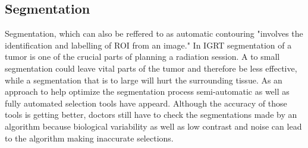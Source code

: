 \subsection{Segmentation}
\label{Segmentation}
Segmentation, which can also be reffered to as automatic contouring "involves the identification and labelling of ROI from an image."
 \cite[p.139]{lineyMRIRadiotherapyPlanning2019}
In IGRT segmentation of a tumor is one of the crucial parts of planning a radiation session. A to small segmentation could leave vital parts of the tumor and therefore be less effective, while a segmentation that is to large will hurt the surrounding tissue.
As an approach to help optimize the segmentation process semi-automatic as well as fully automated selection tools have appeard.
\cite{heckelSketchBasedEditingTools2013}
Although the accuracy of those tools is getting better, doctors still have to check the segmentations made by an algorithm because biological variability as well as low contrast and noise can lead to the algorithm making inaccurate selections.
